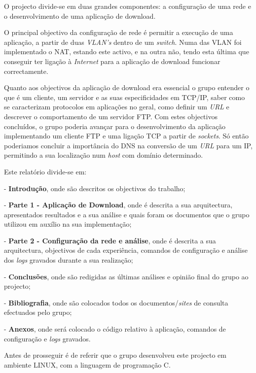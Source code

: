 \documentclass[a4paper]{article}
\begin{document}
O projecto divide-se em duas grandes componentes: a configuração de uma rede e o desenvolvimento de uma aplicação de download.\linebreak

O principal objectivo da configuração de rede é permitir a execução de uma aplicação, a partir de duas \textit{VLAN's} dentro de um \textit{switch}. Numa das VLAN foi implementado o NAT, estando este activo, e na outra não, tendo esta última que conseguir ter ligação à \textit{Internet} para a aplicação de download funcionar correctamente.

Quanto aos objectivos da aplicação de download era essencial o grupo entender o que é um cliente, um servidor e as suas especificidades em TCP/IP, saber como se caracterizam protocolos em aplicações no geral, como definir um \textit{URL} e descrever o comportamento de um servidor FTP. Com estes objectivos concluídos, o grupo poderia avançar para o desenvolvimento da aplicação implementando um cliente FTP e uma ligação TCP a partir de \textit{sockets}. Só então poderiamos concluir a importância do DNS na conversão de um \textit{URL} para um IP, permitindo a sua localização num \textit{host} com domínio determinado.\linebreak

Este relatório divide-se em:

- \textbf{Introdução}, onde são descritos os objectivos do trabalho;

- \textbf{Parte 1 - Aplicação de Download}, onde é descrita a sua arquitectura, apresentados resultados e a sua análise e quais foram os documentos que o grupo utilizou em auxílio na sua implementação;

- \textbf{Parte 2 - Configuração da rede e análise}, onde é descrita a sua arquitectura, objectivos de cada experiência, comandos de configuração e análise dos \textit{logs} gravados durante a sua realização;

- \textbf{Conclusões}, onde são redigidas as últimas análises e opinião final do grupo ao projecto;

- \textbf{Bibliografia}, onde são colocados todos os documentos/\textit{sites} de consulta efectuados pelo grupo;

- \textbf{Anexos}, onde será colocado o código relativo à aplicação, comandos de configuração e \textit{logs} gravados.\linebreak

Antes de prosseguir é de referir que o grupo desenvolveu este projecto em ambiente LINUX, com a linguagem de programação C.
\end{document}
